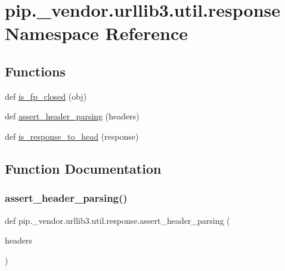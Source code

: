 \hypertarget{namespacepip_1_1__vendor_1_1urllib3_1_1util_1_1response}{}\section{pip.\+\_\+vendor.\+urllib3.\+util.\+response Namespace Reference}
\label{namespacepip_1_1__vendor_1_1urllib3_1_1util_1_1response}
\subsection*{Functions}
\begin{DoxyCompactItemize}
\item 
def \hyperlink{namespacepip_1_1__vendor_1_1urllib3_1_1util_1_1response_a19156ded47f236d89ea54974733eb005}{is\+\_\+fp\+\_\+closed} (obj)
\item 
def \hyperlink{namespacepip_1_1__vendor_1_1urllib3_1_1util_1_1response_a78e7c62a37f162a536bec248b15b0aec}{assert\+\_\+header\+\_\+parsing} (headers)
\item 
def \hyperlink{namespacepip_1_1__vendor_1_1urllib3_1_1util_1_1response_aca408bfc7dd979b6bc8f433bd104f689}{is\+\_\+response\+\_\+to\+\_\+head} (response)
\end{DoxyCompactItemize}


\subsection{Function Documentation}
\mbox{\label{namespacepip_1_1__vendor_1_1urllib3_1_1util_1_1response_a78e7c62a37f162a536bec248b15b0aec}} 
\subsubsection{\texorpdfstring{assert\+\_\+header\+\_\+parsing()}{assert\_header\_parsing()}}
{\footnotesize\ttfamily def pip.\+\_\+vendor.\+urllib3.\+util.\+response.\+assert\+\_\+header\+\_\+parsing (\begin{DoxyParamCaption}\item[{}]{headers }\end{DoxyParamCaption})}

